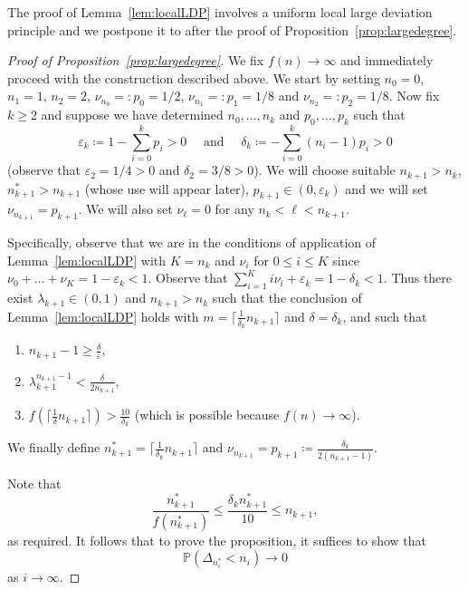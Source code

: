 \documentclass[10pt]{amsart}
\theoremstyle{definition}\newtheorem{defi}[theo]{Definition}\newtheorem{rema}[theo]{Remark}\newtheorem{exam}[theo]{Example}\newtheorem{exem}[theo]{Example}\newtheorem{nota}[theo]{Notation}
\renewcommand{\P}{\mathbb{P}}
\newcommand*{\romanenumi}{\renewcommand*{\theenumi}{\roman{enumi}}}
\begin{document}
The proof of Lemma~\ref{lem:localLDP} involves a uniform local large deviation principle and we postpone it to after the proof of Proposition~\ref{prop:largedegree}.

\begin{proof}[Proof of Proposition~\ref{prop:largedegree}]
We fix $f(n)\to \infty$ and immediately proceed with the construction described above. We start by setting $n_{0}=0$, $n_1=1$, $n_2=2$, ${\nu}_{n_0}=:p_{0}=1/2$, ${\nu}_{n_1}=:p_1=1/8$ and ${\nu}_{n_2}=:p_2=1/8$. Now fix $k\geq 2$ and suppose we have determined $n_0,\dots,n_k$ and $p_0,\dots, p_k$ such that
\[
\varepsilon_k\coloneqq1-\sum_{i=0}^{k}p_i >0\quad \text{ and } \quad
\delta_k\coloneqq-\sum_{i=0}^{k}(n_i-1)p_i>0
\]
(observe that $\varepsilon_2=1/4>0$ and ${\delta_2}=3/8>0$). We will choose suitable $n_{k+1}>n_k$, $n_{k+1}^*>n_{k+1}$ (whose use will appear later), $p_{k+1} \in (0,\varepsilon_{k})$ and we will set ${\nu}_{n_{k+1}}=p_{k+1}$. We will also set ${\nu}_\ell=0$ for any $n_k<\ell<n_{k+1}$.


Specifically, observe that we are in the conditions of application of Lemma~\ref{lem:localLDP} with $K=n_k$ and $\nu_i$ for $0 \leq i\leq K$ since $\nu_0+\dots+\nu_K=1-\varepsilon_{k}<1$. Observe that $\sum_{i=1}^K i\nu_i+\varepsilon_{k}=1-\delta_{k}<1$. Thus there exist $\lambda_{k+1} \in (0,1)$ and $n_{k+1}>n_{k}$ such that the conclusion of Lemma~\ref{lem:localLDP} holds with $m=\lceil \tfrac{1}{\delta_{k}} n_{k+1} \rceil$ and $\delta=\delta_{k}$, and such that
\begin{enumerate}\romanenumi
\item\label{(1)} $n_{k+1}-1\geq \frac{\delta}{\varepsilon}$,
\item\label{(2)} $ \lambda_{k+1}^{n_{k+1}-1} <\frac{\delta}{2n_{k+1}}$, 
\item\label{(3)} $f(\lceil \tfrac{1}{\delta} n_{k+1}\rceil)>\frac{10}{\delta_{k}}$ (which is possible because $f(n)\to \infty$).
\end{enumerate}
We finally define $n_{k+1}^*=\lceil\tfrac{1}{\delta_{k}}n_{k+1}\rceil$ and $ \nu_{n_{k+1}}=p_{k+1} \coloneqq \frac{\delta_{k}}{2 (n_{k+1}-1)}$.

Note that
\[
\frac{n_{k+1}^*}{f\left(n_{k+1}^*\right)} \le \frac{\delta_k n_{k+1}^*}{10} \le n_{k+1},
\]
as required. It follows that to prove the proposition, it suffices to show that
\begin{equation}\label{eq:delta0}
\P\left(\Delta_{n^*_i}< n_i\right)\to 0
\end{equation}
as $i \to \infty$.


\end{proof}
\end{document}
